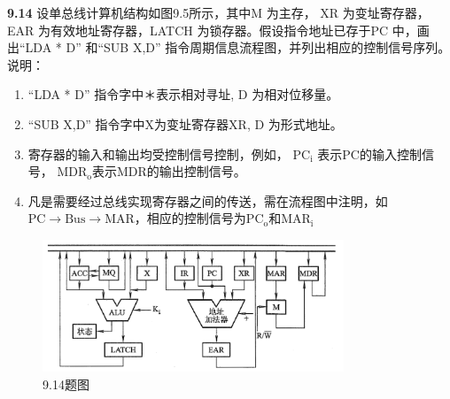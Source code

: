 \documentclass[UTF8]{report}
\newcommand{\problem}[1]{{\setlength{\parskip}{10pt}\noindent \bf{#1}}}
\begin{document}
\problem{9.14} 设单总线计算机结构如图9.5所示，其中M 为主存， XR 为变址寄存器， EAR 为有效地址寄存器，LATCH 为锁存器。假设指令地址已存于PC 中，画出``LDA * D'' 和``SUB X,D'' 指令周期信息流程图，并列出相应的控制信号序列。
说明：
\begin{enumerate}[label=(\arabic*)]
    \item ``LDA * D'' 指令字中＊表示相对寻址, D 为相对位移量。
    \item ``SUB X,D'' 指令字中X为变址寄存器XR, D 为形式地址。
    \item 寄存器的输入和输出均受控制信号控制，例如， $\mathrm{PC_i}$ 表示PC的输入控制信号， $\mathrm{MDR_o}$表示MDR的输出控制信号。
    \item 凡是需要经过总线实现寄存器之间的传送，需在流程图中注明，如$\mathrm{PC \rightarrow Bus \rightarrow MAR}$，相应的控制信号为$\mathrm{PC_o}$和$\mathrm{MAR_i}$
\end{enumerate}
\begin{figure}[!htbp]
    \centering
    \includegraphics[width=9cm]{fig/9.14.png}
    \caption{9.14题图}
    \label{fig:9_14}
\end{figure}

\newpage
\end{document}
